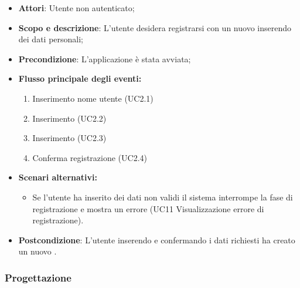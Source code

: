                 \begin{itemize}
                    \item\textbf{Attori}: Utente non autenticato;
                    \item\textbf{Scopo e descrizione}: L’utente desidera registrarsi con un nuovo  inserendo dei dati personali;
                    \item\textbf{Precondizione}: L’applicazione è stata avviata;
                    \item\textbf{Flusso principale degli eventi:}
                        \begin{enumerate}
                            \item Inserimento nome utente (UC2.1)
                            \item Inserimento  (UC2.2)
                            \item Inserimento  (UC2.3)
                            \item Conferma registrazione (UC2.4)
                        \end{enumerate}
                    \item\textbf{Scenari alternativi:}
                        \begin{itemize}
                            \item Se l’utente ha inserito dei dati non validi il sistema interrompe la fase di registrazione e mostra un errore (UC11 Visualizzazione errore di registrazione).
                        \end{itemize}
                    \item\textbf{Postcondizione}: L’utente inserendo e confermando i dati richiesti ha creato un nuovo .
                \end{itemize}
            

        \subsubsection{Progettazione}
